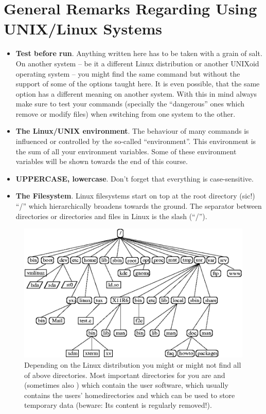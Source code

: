 \documentclass[letterpaper,10pt,english]{sphinxmanual}
\begin{document}
\section{General Remarks Regarding Using UNIX/Linux Systems}
\label{introduction:general-remarks-regarding-using-unix-linux-systems}\begin{itemize}
\item {} 
\textbf{Test before run}. Anything written here has to be taken with a grain of salt. On another system – be it a different Linux distribution or another UNIXoid operating system – you might find the same command but without the support of some of the options taught here. It is even possible, that the same option has a different meaning on another system. With this in mind always make sure to test your commands (specially the “dangerous” ones which remove or modify files) when switching from one system to the other.

\item {} 
\textbf{The Linux/UNIX environment}. The behaviour of many commands is influenced or controlled by the so-called “environment”. This environment is the sum of all your environment variables. Some of these environment variables will be shown towards the end of this course.

\item {} 
\textbf{UPPERCASE, lowercase}. Don’t forget that everything is case-sensitive.

\item {} 
\textbf{The Filesystem}. Linux filesystems start on top at the root directory (sic!) “/” which hierarchically broadens towards the ground.  The separator between directories or directories and files in Linux is the slash (“/”).

\end{itemize}
\begin{figure}[htbp]
\centering
\capstart

\includegraphics{_static/filesystem.png}
\caption{Depending on the Linux distribution you might or might not find all of above
directories. Most important directories for you are  and 
(sometimes also ) which contain the user software,  which
usually contains the users’ homedirectories and  which can be used to store
temporary data (beware: Its content is regularly removed!).}\end{figure}
\end{document}
